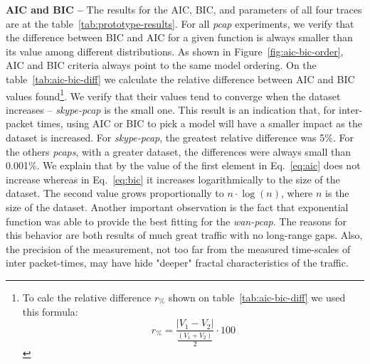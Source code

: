 \textbf{AIC and BIC --} The results for the AIC, BIC, and parameters of all four traces are at the table~\ref{tab:prototype-results}. For all \textit{pcap} experiments, we verify that the difference between BIC and AIC for a given function is always smaller than its value among different distributions. As shown in Figure~\ref{fig:aic-bic-order}, AIC and BIC criteria always point to the same model ordering. On the table~\ref{tab:aic-bic-diff} we calculate the relative difference between AIC and BIC values found\footnote{ 
To calc the relative difference $r_\%$ shown on table~\ref{tab:aic-bic-diff} we used this formula:
\begin{equation}
    r_\% = \frac{|V_1-V_2|}{\frac{(V_1+V_2)}{2}}\cdot100 
\end{equation}
}. We verify that their values tend to converge when the dataset increases -- \textit{skype-pcap} is the small one.  This result is an indication that, for inter-packet times, using AIC or BIC to pick a model will have a smaller impact as the dataset is increased. For \textit{skype-pcap}, the greatest relative difference was 5\%. For the others \textit{pcaps}, with a greater dataset, the differences were always small than 0.001\%. We explain that by the value of the first element in Eq.~\ref{eq:aic} does not increase whereas in Eq.~\ref{eq:bic} it increases logarithmically to the size of the dataset. The second value grows proportionally to $n\cdot \log(n)$, where $n$ is the size of the dataset. Another important observation is the fact that exponential function was able to provide the best fitting for the \textit{wan-pcap}. The reasons for this behavior are both results of much great traffic with no long-range gaps. Also, the precision of the measurement, not too far from the measured time-scales of inter packet-times, may have hide "deeper" fractal characteristics of the traffic.

